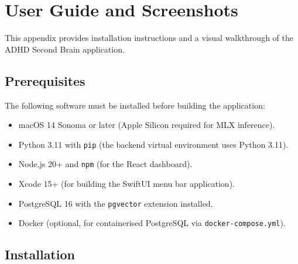 
\chapter{User Guide and Screenshots}
\label{app:user-guide}

This appendix provides installation instructions and a visual walkthrough of the ADHD Second Brain application.

\section{Prerequisites}

The following software must be installed before building the application:

\begin{itemize}
  \item macOS 14 Sonoma or later (Apple Silicon required for MLX inference).
  \item Python 3.11 with \texttt{pip} (the backend virtual environment uses Python 3.11).
  \item Node.js 20+ and \texttt{npm} (for the React dashboard).
  \item Xcode 15+ (for building the SwiftUI menu bar application).
  \item PostgreSQL 16 with the \texttt{pgvector} extension installed.
  \item Docker (optional, for containerised PostgreSQL via \texttt{docker-compose.yml}).
\end{itemize}

\section{Installation}

